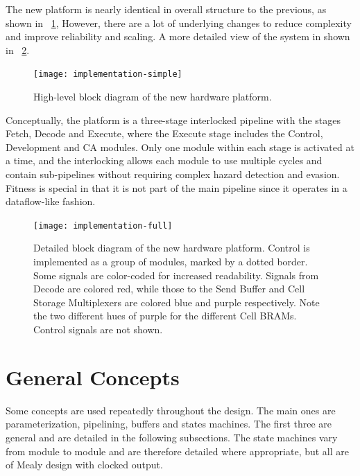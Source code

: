 The new platform is nearly identical in overall structure to the previous, as shown in \figurename~\ref{fig:implementation-simple},
However, there are a lot of underlying changes to reduce complexity and improve reliability and scaling.
A more detailed view of the system in shown in \figurename~\ref{fig:implementation-full}.

\begin{figure}[!ht]
    \centering
    \texttt{[image: implementation-simple]}
    \caption[High-level system diagram]{
        High-level block diagram of the new hardware platform.
    }
    \label{fig:implementation-simple}
\end{figure}

Conceptually, the platform is a three-stage interlocked pipeline with the stages Fetch, Decode and Execute, where the Execute stage includes the Control, Development and CA modules.
Only one module within each stage is activated at a time, and the interlocking allows each module to use multiple cycles and contain sub-pipelines without requiring complex hazard detection and evasion.
Fitness is special in that it is not part of the main pipeline since it operates in a dataflow-like fashion.

\begin{figure}
    \centering
    \texttt{[image: implementation-full]}
    \caption[Detailed system diagram]{
        Detailed block diagram of the new hardware platform.
        Control is implemented as a group of modules, marked by a dotted border.
        Some signals are color-coded for increased readability.
        Signals from Decode are colored red, while those to the Send Buffer and Cell Storage Multiplexers are colored blue and purple respectively.
        Note the two different hues of purple for the different Cell BRAMs.
        Control signals are not shown.
    }
    \label{fig:implementation-full}
\end{figure}


\section{General Concepts}

Some concepts are used repeatedly throughout the design.
The main ones are parameterization, pipelining, buffers and states machines.
The first three are general and are detailed in the following subsections.
The state machines vary from module to module and are therefore detailed where appropriate, but all are of Mealy design with clocked output.

